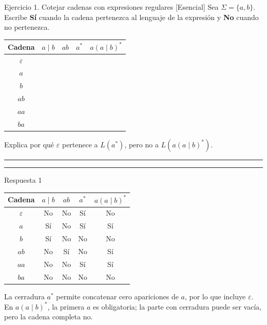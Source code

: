 \documentclass[11pt,spanish]{article}
\newcommand{\blank}[1][4cm]{\rule{#1}{0.4pt}}
\newcommand{\espaciosalida}{0.10cm}
\newcommand{\espaciosalida}{0.60cm}
\begin{document}
\begin{ejercicio}{Ejercicio 1. Cotejar cadenas con expresiones regulares \hfill {\small [Esencial]}}
Sea \(\Sigma=\{a,b\}\). Escribe \textbf{Sí} cuando la cadena pertenezca al lenguaje de la expresión y \textbf{No} cuando no pertenezca.

\begin{center}
\small
\renewcommand{\arraystretch}{1.3}
\begin{tabular}{|c|c|c|c|c|}
\hline
\textbf{Cadena} & \(a\mid b\) & \(ab\) & \(a^{*}\) & \(a(a\mid b)^{*}\) \tabularnewline
\hline
\(\varepsilon\) & & & & \tabularnewline[\espaciosalida]
\hline
\(a\) & & & & \tabularnewline[\espaciosalida]
\hline
\(b\) & & & & \tabularnewline[\espaciosalida]
\hline
\(ab\) & & & & \tabularnewline[\espaciosalida]
\hline
\(aa\) & & & & \tabularnewline[\espaciosalida]
\hline
\(ba\) & & & & \tabularnewline[\espaciosalida]
\hline
\end{tabular}
\end{center}

Explica por qué \(\varepsilon\) pertenece a \(L(a^{*})\), pero no a \(L(a(a\mid b)^{*})\).

\ifrespuestas\else
\blank[14cm]

\blank[14cm]
\fi
\end{ejercicio}

\ifrespuestas
\begin{respuesta}{Respuesta 1}
\begin{center}
\small
\renewcommand{\arraystretch}{1.15}
\begin{tabular}{|c|c|c|c|c|}
\hline
\textbf{Cadena} & \(a\mid b\) & \(ab\) & \(a^{*}\) & \(a(a\mid b)^{*}\) \tabularnewline
\hline
\(\varepsilon\) & No & No & Sí & No \tabularnewline
\hline
\(a\) & Sí & No & Sí & Sí \tabularnewline
\hline
\(b\) & Sí & No & No & No \tabularnewline
\hline
\(ab\) & No & Sí & No & Sí \tabularnewline
\hline
\(aa\) & No & No & Sí & Sí \tabularnewline
\hline
\(ba\) & No & No & No & No \tabularnewline
\hline
\end{tabular}
\end{center}

La cerradura \(a^{*}\) permite concatenar cero apariciones de \(a\), por lo que incluye \(\varepsilon\). En \(a(a\mid b)^{*}\), la primera \(a\) es obligatoria; la parte con cerradura puede ser vacía, pero la cadena completa no.
\end{respuesta}
\fi
\end{document}
